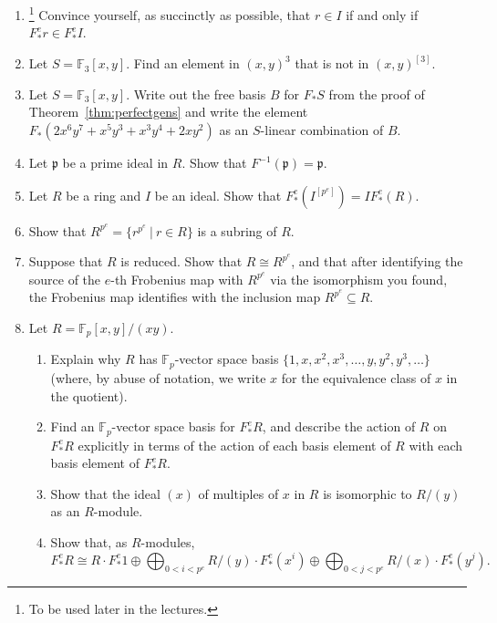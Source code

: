 \documentclass[12pt]{amsart}
\theoremstyle{definition}
\numberwithin{equation}{theorem}
\def\frakp{\mathfrak{p}}
\def\FF{\mathbb{F}}
\begin{document}
\begin{enumerate}
\item\footnote[1]{To be used later in the lectures.} Convince yourself, as succinctly as possible, that $r\in I$ if and only if $F^e_* r\in F^e_* I$.
\item\label{prob2} Let $S=\FF_3[x,y]$. Find an element in $(x,y)^3$ that is not in $(x,y)^{[3]}$.
\item Let $S=\FF_3[x,y]$. Write out the free basis $B$ for $F_*S$ from the proof of Theorem~\ref{thm:perfectgens} and write the element $F_*(2 x^6 y^7 + x^5 y^3 + x^3 y^4 + 2 x y^2)$ as an $S$-linear combination of $B$.
\item Let $\frakp$ be a prime ideal in $R$. Show that $F^{-1}(\frakp)=\frakp$.
\item\footnotemark[1] Let $R$ be a ring and $I$ be an ideal. Show that $F^e_*(I^{[p^e]}) = I F^e_*(R)$.
\item Show that $R^{p^e}= \{ r^{p^e} \ | \ r\in R\}$ is a subring of $R$. 
\item Suppose that $R$ is reduced. Show that $R \cong R^{p^e}$, and that after identifying the source of the $e$-th Frobenius map with $R^{p^e}$ via the isomorphism you found, the Frobenius map identifies with the inclusion map $R^{p^e} \subseteq R$.
\item\footnotemark[1] Let $R=\FF_p[x,y]/(xy)$.
\begin{enumerate}
\item Explain why $R$ has $\FF_p$-vector space basis $\{1, x, x^2, x^3, \dots, y, y^2, y^3,\dots\}$  (where, by abuse of notation, we write $x$ for the equivalence class of $x$ in the quotient).
\item Find an $\FF_p$-vector space basis for $F^e_* R$, and describe the action of $R$ on $F^e_*R$ explicitly in terms of the action of each basis element of $R$ with each basis element of $F^e_* R$.
\item Show that the ideal $(x)$ of multiples of $x$ in $R$ is isomorphic to $R/(y)$ as an $R$-module.
\item Show that, as $R$-modules,  
\[ F^e_* R \cong R \cdot F^e_*1 \oplus \bigoplus_{0<i<p^e} R/(y) \cdot F^e_*(x^i) \oplus \bigoplus_{0<j<p^e} R/(x) \cdot F^e_*(y^j).\] 
\end{enumerate}

\end{enumerate}
\end{document}
